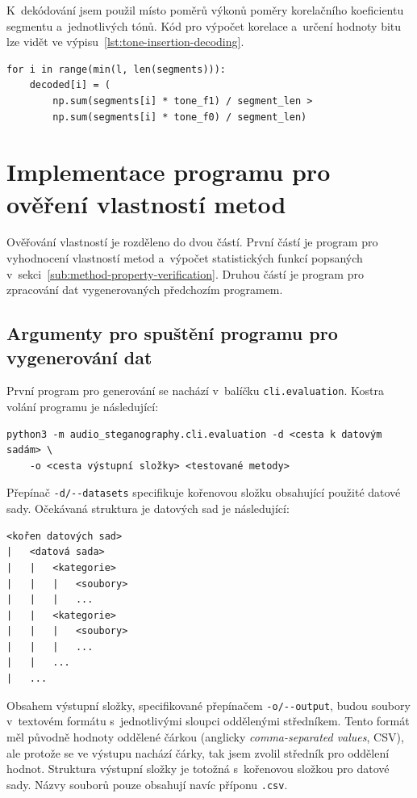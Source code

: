 K~dekódování jsem použil místo poměrů výkonů poměry korelačního koeficientu
segmentu a~jednotlivých tónů. Kód pro výpočet korelace a~určení hodnoty bitu
lze vidět ve výpisu~\ref{lst:tone-insertion-decoding}.

\begin{lstlisting}[language=PythonPlus, label={lst:tone-insertion-decoding},
caption={Výpočet korelace mezi segmenty a~tóny.}]
for i in range(min(l, len(segments))):
    decoded[i] = (
        np.sum(segments[i] * tone_f1) / segment_len >
        np.sum(segments[i] * tone_f0) / segment_len)
\end{lstlisting}

\section{Implementace programu pro ověření vlastností metod}
\label{sec:evaluation-program-implementation}

Ověřování vlastností je rozděleno do dvou částí. První částí je program pro
vyhodnocení vlastností metod a~výpočet statistických funkcí popsaných
v~sekci~\ref{sub:method-property-verification}. Druhou částí je program pro
zpracování dat vygenerovaných předchozím programem.

\subsection*{Argumenty pro spuštění programu pro vygenerování dat}
\label{sub:evaluation-program-tui-arguments}

První program pro generování se nachází v~balíčku \texttt{cli.evaluation}.
Kostra volání programu je následující:

\begin{verbatim}
python3 -m audio_steganography.cli.evaluation -d <cesta k datovým sadám> \
    -o <cesta výstupní složky> <testované metody>
\end{verbatim}

\noindent Přepínač \verb|-d/--datasets| specifikuje kořenovou složku obsahující
použité datové sady. Očekávaná struktura je datových sad je následující:

\begin{verbatim}
<kořen datových sad>
|   <datová sada>
|   |   <kategorie>
|   |   |   <soubory>
|   |   |   ...
|   |   <kategorie>
|   |   |   <soubory>
|   |   |   ...
|   |   ...
|   ...
\end{verbatim}

\noindent Obsahem výstupní složky, specifikované přepínačem \verb|-o/--output|,
budou soubory v~textovém formátu s~jednotlivými sloupci oddělenými středníkem.
Tento formát měl původně hodnoty oddělené čárkou (anglicky
\textit{comma-separated values}, CSV), ale protože se ve výstupu nachází čárky,
tak jsem zvolil středník pro oddělení hodnot. Struktura výstupní složky je
totožná s~kořenovou složkou pro datové sady. Názvy souborů pouze obsahují navíc
příponu \texttt{.csv}.

